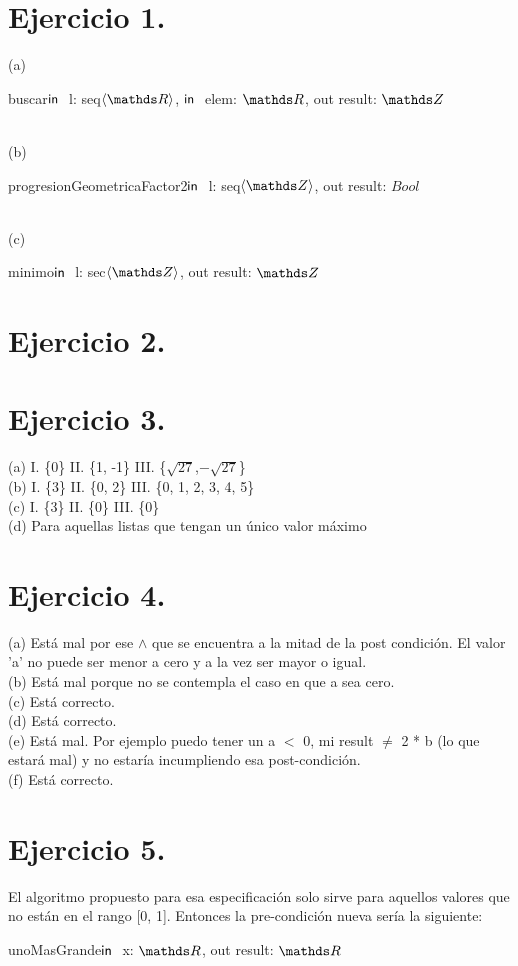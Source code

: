 \documentclass{article}
\begin{document}
	\section{Ejercicio 1.}
	(a)
	\begin{proc}{buscar}{$\textsf{in }$ l: seq$\langle\float\rangle$, $\textsf{in }$ elem: $\float$, out result: $\ent$}{}
	\end{proc}\\
	(b)
	\begin{proc}{progresionGeometricaFactor2}{$\textsf{in }$ l: seq$\langle\ent\rangle$, out result: $Bool$}{}
	\end{proc}\\
	(c)
	\begin{proc}{minimo}{$\textsf{in }$ l: sec$\langle\ent\rangle$, out result: $\ent$}{}
	\end{proc}

	\section{Ejercicio 2.}

	\section{Ejercicio 3.}
	(a)
	I. \{0\}
	II. \{1, -1\}
	III. \{$\sqrt{27}$,$-\sqrt{27}$\}\\
	(b)
	I. \{3\}
	II. \{0, 2\}
	III. \{0, 1, 2, 3, 4, 5\}\\
	(c)
	I. \{3\}
	II. \{0\}
	III. \{0\}\\
	(d) Para aquellas listas que tengan un \'unico valor m\'aximo
	
	\section{Ejercicio 4.}
	(a) Est\'a mal por ese $\wedge$ que se encuentra a la mitad de la post condici\'on. El valor 'a' no puede ser menor a cero y a la vez ser mayor o igual.\\
	(b) Est\'a mal porque no se contempla el caso en que a sea cero.\\
	(c) Est\'a correcto.\\
	(d) Est\'a correcto.\\
	(e) Est\'a mal. Por ejemplo puedo tener un a $<$ 0, mi result $\neq$ 2 * b (lo que estar\'a mal) y no estaría incumpliendo esa post-condici\'on.\\
	(f) Est\'a correcto.
	
	\section{Ejercicio 5.}
	El algoritmo propuesto para esa especificaci\'on solo sirve para aquellos valores que no est\'an en el rango [0, 1]. Entonces la pre-condici\'on nueva sería la siguiente:
	\begin{proc}{unoMasGrande}{$\textsf{in }$ x: $\float$, out result: $\float$}{}
	\end{proc}
\end{document}
